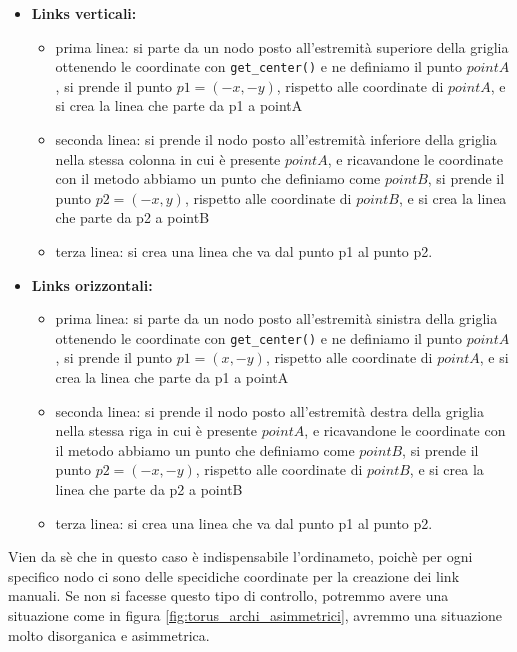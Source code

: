 \documentclass[binding=0.6cm]{sapthesis}
\begin{document}
\begin{itemize}
    \item \textbf{Links verticali:} 
    \begin{itemize}
        \item prima linea: si parte da un nodo posto all'estremità superiore della griglia ottenendo le coordinate con \lstinline|get_center()| e ne definiamo il punto \(pointA\), si prende il punto \(p1 = (-x, -y)\), rispetto alle coordinate di \(pointA\), e si crea la linea che parte da p1 a pointA
        \item seconda linea: si prende il nodo posto all'estremità inferiore della griglia nella stessa colonna in cui è presente \(pointA\), e ricavandone le coordinate con il metodo abbiamo un punto che definiamo come \(pointB\), si prende il punto \(p2 = (-x, y)\), rispetto alle coordinate di \(pointB\), e si crea la linea che parte da p2 a pointB 
        \item terza linea: si crea una linea che va dal punto p1 al punto p2.
    \end{itemize}
    \item \textbf{Links orizzontali:} 
    \begin{itemize}
        \item prima linea: si parte da un nodo posto all'estremità sinistra della griglia ottenendo le coordinate con \lstinline|get_center()| e ne definiamo il punto \(pointA\), si prende il punto \(p1 = (x, -y)\), rispetto alle coordinate di \(pointA\), e si crea la linea che parte da p1 a pointA
        \item seconda linea: si prende il nodo posto all'estremità destra della griglia nella stessa riga in cui è presente \(pointA\), e ricavandone le coordinate con il metodo abbiamo un punto che definiamo come \(pointB\), si prende il punto \(p2 = (-x, -y)\), rispetto alle coordinate di \(pointB\), e si crea la linea che parte da p2 a pointB 
        \item terza linea: si crea una linea che va dal punto p1 al punto p2.
    \end{itemize}

\end{itemize}

Vien da sè che in questo caso è indispensabile l'ordinameto, poichè per ogni specifico nodo ci sono delle specidiche coordinate per la creazione dei link manuali.
Se non si facesse questo tipo di controllo, potremmo avere una situazione come in figura \ref{fig:torus_archi_asimmetrici}, avremmo una situazione
molto disorganica e asimmetrica.
\end{document}
